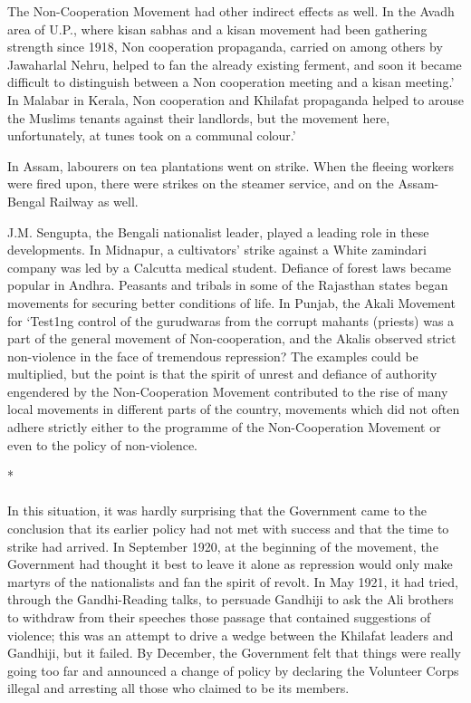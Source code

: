 The Non-Cooperation Movement had other indirect effects as well. In the Avadh area of U.P., where kisan sabhas and a kisan movement had been gathering strength since 1918, Non­ cooperation propaganda, carried on among others by Jawaharlal Nehru, helped to fan the already existing ferment, and soon it became difficult to distinguish between a Non cooperation meeting and a kisan meeting.' In Malabar in Kerala, Non cooperation and Khilafat propaganda helped to arouse the Muslims tenants against their landlords, but the movement here, unfortunately, at tunes took on a communal colour.' 

In Assam, labourers on tea plantations went on strike. When the fleeing workers were fired upon, there were strikes on the steamer service, and on the Assam-Bengal Railway as well. 

J.M. Sengupta, the Bengali nationalist leader, played a leading role in these developments. In Midnapur, a cultivators' strike against a White zamindari company was led by a Calcutta medical student. Defiance of forest laws became popular in Andhra. Peasants and tribals in some of the Rajasthan states began movements for securing better conditions of life. In Punjab, the Akali Movement for `Test1ng control of the gurudwaras from the corrupt mahants (priests) was a part of the general movement of Non-cooperation, and the Akalis observed strict non-violence in the face of tremendous repression? The examples could be multiplied, but the point is that the spirit of unrest and defiance of authority engendered by the Non-Cooperation Movement contributed to the rise of many local movements in different parts of the country, movements which did not often adhere strictly either to the programme of the Non-Cooperation Movement or even to the policy of non-violence.

\begin{center}*\end{center}

\paragraph*{}


In this situation, it was hardly surprising that the Government came to the conclusion that its earlier policy had not met with success and that the time to strike had arrived. In September 1920, at the beginning of the movement, the Government had thought it best to leave it alone as repression would only make martyrs of the nationalists and fan the spirit of revolt. In May 1921, it had tried, through the Gandhi-Reading talks, to persuade Gandhiji to ask the Ali brothers to withdraw from their speeches those passage that contained suggestions of violence; this was an attempt to drive a wedge between the Khilafat leaders and Gandhiji, but it failed. By December, the Government felt that things were really going too far and announced a change of policy by declaring the Volunteer Corps illegal and arresting all those who claimed to be its members. 

